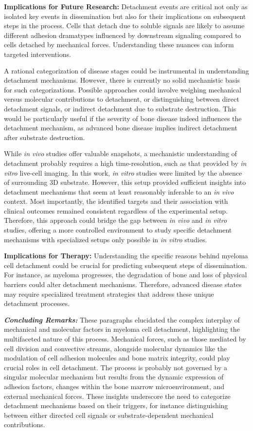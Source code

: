 \textbf{Implications for Future Research:} %
Detachment events are critical not only as isolated key events in dissemination
but also for their implications on subsequent steps in the process. Cells that
detach due to soluble signals are likely to assume different adhesion dramatypes
influenced by downstream signaling compared to cells detached by mechanical
forces. Understanding these nuances can inform targeted interventions.

A rational categorization of disease stages could be instrumental in
understanding detachment mechanisms. However, there is currently no solid
mechanistic basis for such categorizations. Possible approaches could involve
weighing mechanical versus molecular contributions to detachment, or
distinguishing between direct detachment signals, or indirect detachment due to
substrate destruction. This would be particularly useful if the severity of bone
disease indeed influences the detachment mechanism, as advanced bone disease
implies indirect detachment after substrate destruction.

While \textit{in vivo} studies offer valuable snapshots, a mechanistic
understanding of detachment probably requires a high time-resolution, such as
that provided by \textit{in vitro} live-cell imaging. In this work, \textit{in
      vitro} studies were limited by the absence of surrounding 3D substrate. However,
this setup provided sufficient insights into detachment mechanisms that seem at
least reasonably inferable to an \textit{in vivo} context. Most importantly, the
identified targets and their association with clinical outcomes remained
consistent regardless of the experimental setup. Therefore, this approach could
bridge the gap between \textit{in vivo} and \textit{in vitro} studies, offering
a more controlled environment to study specific detachment mechanisms with
specialized setups only possible in \textit{in vitro} studies.


\textbf{Implications for Therapy:}%
Understanding the specific reasons behind myeloma cell detachment could be
crucial for predicting subsequent steps of dissemination. For instance, as
myeloma progresses, the degradation of bone and loss of physical barriers could
alter detachment mechanisms. Therefore, advanced disease states may require
specialized treatment strategies that address these unique detachment processes.


\textbf{\textit{Concluding Remarks:}}%
These paragraphs elucidated the complex interplay of mechanical and molecular
factors in myeloma cell detachment, highlighting the multifaceted nature of this
process. Mechanical forces, such as those mediated by cell division and
convective streams, alongside molecular dynamics like the modulation of cell
adhesion molecules and bone matrix integrity, could play crucial roles in cell
detachment. The process is probably not governed by a singular molecular
mechanism but results from the dynamic expression of adhesion factors, changes
within the bone marrow microenvironment, and external mechanical forces. These
insights underscore the need to categorize detachment mechanisms based on their
triggers, for instance distinguishing between either directed cell signals or
substrate-dependent mechanical contributions.

